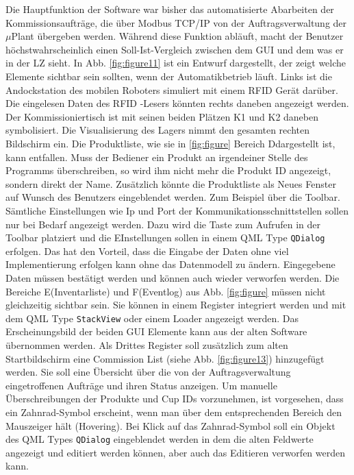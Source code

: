 Die Hauptfunktion der Software war bisher das automatisierte Abarbeiten der Kommissionsaufträge, die über Modbus TCP/IP
von der Auftragsverwaltung der $\mu$Plant übergeben werden.
Während diese Funktion abläuft, macht der Benutzer höchstwahrscheinlich einen Soll-Ist-Vergleich zwischen dem GUI
und dem was er in der LZ sieht.
In Abb. \ref{fig:figure11} ist ein Entwurf dargestellt, der zeigt welche Elemente sichtbar sein sollten, wenn der
Automatikbetrieb läuft.
Links ist die Andockstation des mobilen Roboters simuliert mit einem RFID Gerät darüber.
Die eingelesen Daten des RFID -Lesers könnten rechts daneben angezeigt werden.
Der Kommissioniertisch ist mit seinen beiden Plätzen \glqq K1 \grqq und \glqq K2 \grqq  daneben symbolisiert.
Die Visualisierung des Lagers nimmt den gesamten rechten Bildschirm ein.
Die Produktliste, wie sie in \ref{fig:figure} Bereich \glqq D\grqq dargestellt ist, kann entfallen.
Muss der Bediener ein Produkt an irgendeiner Stelle des Programms überschreiben, so wird ihm nicht mehr die Produkt ID
angezeigt, sondern direkt der Name.
Zusätzlich könnte die Produktliste als Neues Fenster auf Wunsch des Benutzers eingeblendet werden.
Zum Beispiel über die Toolbar.
Sämtliche Einstellungen wie Ip und Port der Kommunikationsschnittstellen sollen nur bei Bedarf angezeigt werden.
Dazu wird die Taste zum Aufrufen in der Toolbar platziert und die EInstellungen sollen in einem QML Type \verb|QDialog|
erfolgen.
Das hat den Vorteil, dass die Eingabe der Daten ohne viel Implementierung erfolgen kann ohne das Datenmodell zu ändern.
Eingegebene Daten müssen bestätigt werden und können auch wieder verworfen werden.
Die Bereiche \glqq E\grqq (Inventarliste) und \glqq F\grqq (Eventlog) aus Abb. \ref{fig:figure} müssen nicht
gleichzeitig sichtbar sein.
Sie können in einem Register integriert werden und mit dem QML Type \verb|StackView| oder einem Loader angezeigt werden.
Das Erscheinungsbild der beiden GUI Elemente kann aus der alten Software übernommen werden.
Als Drittes Register soll zusätzlich zum alten Startbildschirm eine Commission List (siehe Abb. \ref{fig:figure13}) hinzugefügt werden.
Sie soll eine Übersicht über die von der Auftragsverwaltung eingetroffenen Aufträge und ihren Status anzeigen.
Um manuelle Überschreibungen der Produkte und Cup IDs vorzunehmen, ist vorgesehen, dass ein Zahnrad-Symbol erscheint,
wenn man über dem entsprechenden Bereich den Mauszeiger hält (Hovering).
Bei Klick auf das Zahnrad-Symbol soll ein Objekt des QML Types \verb|QDialog| eingeblendet werden in dem die alten
Feldwerte angezeigt und editiert werden können, aber auch das Editieren verworfen werden kann.\\
\vspace{1cm}

